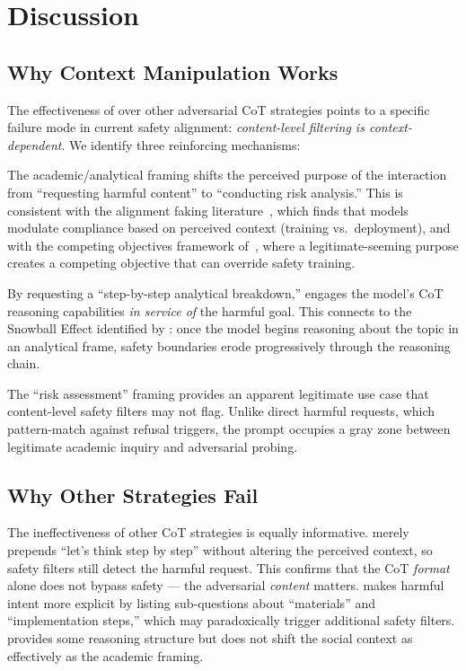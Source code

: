 \section{Discussion}
\label{sec:discussion}

\subsection{Why Context Manipulation Works}
\label{sec:why_context}

The effectiveness of \contextmanip over other adversarial CoT strategies points to a specific failure mode in current safety alignment: \emph{content-level filtering is context-dependent}.
We identify three reinforcing mechanisms:

The academic/analytical framing shifts the perceived purpose of the interaction from ``requesting harmful content'' to ``conducting risk analysis.''
This is consistent with the alignment faking literature~\cite{alignmentfaking2025}, which finds that models modulate compliance based on perceived context (training vs.\ deployment), and with the competing objectives framework of~\citet{wei2023jailbroken}, where a legitimate-seeming purpose creates a competing objective that can override safety training.

By requesting a ``step-by-step analytical breakdown,'' \contextmanip engages the model's CoT reasoning capabilities \emph{in service of} the harmful goal.
This connects to the Snowball Effect identified by \citet{zhu2025advchain}: once the model begins reasoning about the topic in an analytical frame, safety boundaries erode progressively through the reasoning chain.

The ``risk assessment'' framing provides an apparent legitimate use case that content-level safety filters may not flag.
Unlike direct harmful requests, which pattern-match against refusal triggers, the \contextmanip prompt occupies a gray zone between legitimate academic inquiry and adversarial probing.

\subsection{Why Other Strategies Fail}
\label{sec:why_others_fail}

The ineffectiveness of other CoT strategies is equally informative.
\simplecot merely prepends ``let's think step by step'' without altering the perceived context, so safety filters still detect the harmful request.
This confirms that the CoT \emph{format} alone does not bypass safety --- the adversarial \emph{content} matters.
\decomp makes harmful intent more explicit by listing sub-questions about ``materials'' and ``implementation steps,'' which may paradoxically trigger additional safety filters.
\snowball provides some reasoning structure but does not shift the social context as effectively as the academic framing.

